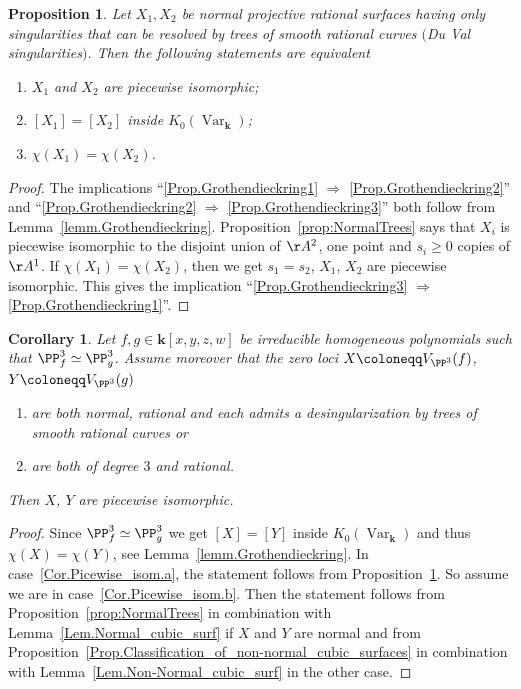 \documentclass[JEP,XML,SOM,Unicode,NoFloatCountersInSection,published]{cedram}
\newenvironment{enumeratea}
{\bgroup\def\theenumi{\alph{enumi}}\begin{enumerate}}
{\end{enumerate}\egroup}
\newtheorem{corollary}[lemma]{Corollary}
\newtheorem{proposition}[lemma]{Proposition}
\theoremstyle{definition}
\renewcommand\k{{\mathbf k}}
\DeclareMathOperator{\Var}{Var}
\begin{document}
\begin{proposition}
\label{Prop.Grothendieckring}
Let $X_1, X_2$ be normal projective rational surfaces having only
singularities
that can be resolved
by trees of smooth rational curves $($\eg Du Val singularities$)$.
Then the following statements are equivalent
\begin{enumerate}
\item \label{Prop.Grothendieckring1} $X_1$ and $X_2$ are piecewise isomorphic;
\item \label{Prop.Grothendieckring2} $[X_1] = [X_2]$ inside $K_0(\Var_\k)$;
\item \label{Prop.Grothendieckring3} $\chi(X_1) = \chi(X_2)$.
\end{enumerate}
\end{proposition}

\begin{proof}
The implications ``\eqref{Prop.Grothendieckring1} $\Rightarrow$ \eqref{Prop.Grothendieckring2}'' and ``\eqref{Prop.Grothendieckring2} $\Rightarrow$ \eqref{Prop.Grothendieckring3}'' both follow
from Lemma~\ref{lemm.Grothendieckring}. Proposition~\ref{prop:NormalTrees} says
that $X_i$ is piecewise isomorphic to the disjoint union of $\AA^2$, one point and $s_i \geq 0$ copies of $\AA^1$.
If $\chi(X_1) = \chi(X_2)$, then we get $s_1 = s_2$, \ie $X_1$, $X_2$ are piecewise isomorphic.
This gives the implication ``\eqref{Prop.Grothendieckring3} $\Rightarrow$ \eqref{Prop.Grothendieckring1}''.
\end{proof}

\begin{corollary}
\label{Cor.Picewise_isom}
Let $f, g \in \k[x, y, z, w]$ be irreducible homogeneous polynomials such that $\PP^3_f \simeq \PP^3_g$.
Assume moreover that the zero loci $X \coloneqq V_{\PP^3}(f)$, $Y \coloneqq V_{\PP^3}(g)$
\begin{enumeratea}
\item \label{Cor.Picewise_isom.a} are both normal, rational and
each admits a desingularization by trees of smooth rational curves or
\item \label{Cor.Picewise_isom.b} are both of degree $3$ and rational.
\end{enumeratea}
\noindent
Then $X$, $Y$ are piecewise isomorphic.
\end{corollary}

\begin{proof}
Since $\PP^3_f \simeq \PP^3_g$ we get $[X] = [Y]$ inside $K_0(\Var_\k)$
and thus $\chi(X) = \chi(Y)$, see Lemma~\ref{lemm.Grothendieckring}. In case~\eqref{Cor.Picewise_isom.a},
the statement follows from Proposition~\ref{Prop.Grothendieckring}.
So assume we are in case~\eqref{Cor.Picewise_isom.b}. Then the statement follows from
Proposition~\ref{prop:NormalTrees} in combination with Lemma~\ref{Lem.Normal_cubic_surf}
if $X$ and $Y$ are normal and from
Proposition~\ref{Prop.Classification_of_non-normal_cubic_surfaces} in combination with
Lemma~\ref{Lem.Non-Normal_cubic_surf} in the other case.
\end{proof}
\end{document}
